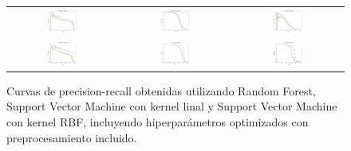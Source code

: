 \begin{figure}[h!]
\begin{center}
\begin{tabular}{ccc}
\includegraphics[width=0.32\textwidth]{Kap4/best-train=b261test=b234.png} &
\includegraphics[width=0.32\textwidth]{Kap4/best-train=b261test=b278.png} &
\includegraphics[width=0.32\textwidth]{Kap4/best-train=b261test=b360.png} \\

\includegraphics[width=0.32\textwidth]{Kap4/best-train=b360test=b234.png} &
\includegraphics[width=0.32\textwidth]{Kap4/best-train=b360test=b261.png} &
\includegraphics[width=0.32\textwidth]{Kap4/best-train=b360test=b278.png}

\end{tabular}

\end{center}
\caption[short]{Curvas de precision-recall obtenidas utilizando Random Forest, Support Vector Machine con kernel linal y Support Vector Machine con kernel RBF, incluyendo hiperparámetros optimizados con preprocesamiento incluido.}
\label{fig:testresultsproc}
\end{figure}

